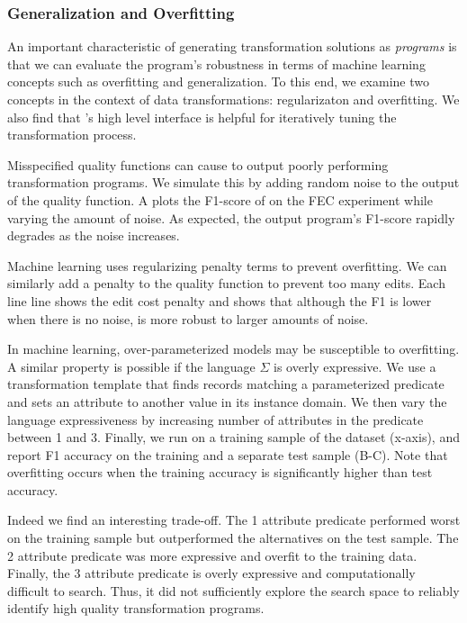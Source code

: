 \subsubsection{Generalization and Overfitting}\label{s:expoverfit}
An important characteristic of generating transformation solutions as {\it programs} is that we can evaluate the program's robustness in terms of machine learning concepts such as overfitting and generalization.    To this end, we examine two concepts in the context of data transformations: regularizaton and overfitting.  We also find that \sys's high level interface is helpful for iteratively tuning the transformation process.

  Misspecified quality functions can cause \sys to output poorly performing transformation programs.  We simulate this by adding random noise to the output of the quality function. A plots the F1-score of \sys on the FEC experiment while varying the amount of noise.  As expected, the output program's F1-score rapidly degrades as the noise increases.  

Machine learning uses regularizing penalty terms to prevent overfitting.  We can similarly add a penalty to the quality function to prevent too many edits.  Each line line shows the edit cost penalty and shows that although the F1 is lower when there is no noise, \sys is more robust to larger amounts of noise. 

 In machine learning, over-parameterized models may be susceptible to overfitting.  A similar property is possible if the language $\Sigma$ is overly expressive.  We use a transformation template that finds records matching a parameterized predicate and sets an attribute to another value in its instance domain.   We then vary the language expressiveness by increasing number of attributes in the predicate between 1 and 3.  Finally, we run \sys on a training sample of the dataset (x-axis), and report F1 accuracy on the training and a separate test sample (B-C).  Note that overfitting occurs when the training accuracy is significantly higher than test accuracy.

Indeed we find an interesting trade-off.  The 1 attribute predicate performed worst on the training sample but outperformed the alternatives on the test sample.  The 2 attribute predicate was more expressive and overfit to the training data.  Finally, the 3 attribute predicate is overly expressive and computationally difficult to search.  Thus, it did not sufficiently explore the search space to reliably identify high quality transformation programs. 

